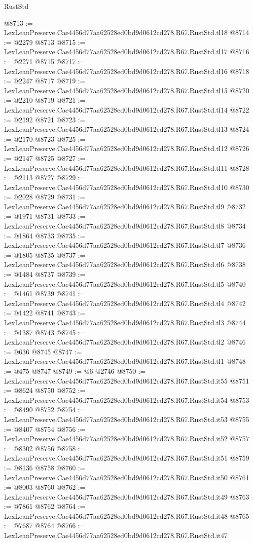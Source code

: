 \begin{lexlean}{RustStd}
\begin{coremodule}
@8713 := LexLeanPreserve.Cae4456d77aa62528ed0bd9d0612cd278.R67.RustStd.tl18
@8714 := @2279 @8713
@8715 := LexLeanPreserve.Cae4456d77aa62528ed0bd9d0612cd278.R67.RustStd.tl17
@8716 := @2271 @8715
@8717 := LexLeanPreserve.Cae4456d77aa62528ed0bd9d0612cd278.R67.RustStd.tl16
@8718 := @2247 @8717
@8719 := LexLeanPreserve.Cae4456d77aa62528ed0bd9d0612cd278.R67.RustStd.tl15
@8720 := @2210 @8719
@8721 := LexLeanPreserve.Cae4456d77aa62528ed0bd9d0612cd278.R67.RustStd.tl14
@8722 := @2192 @8721
@8723 := LexLeanPreserve.Cae4456d77aa62528ed0bd9d0612cd278.R67.RustStd.tl13
@8724 := @2170 @8723
@8725 := LexLeanPreserve.Cae4456d77aa62528ed0bd9d0612cd278.R67.RustStd.tl12
@8726 := @2147 @8725
@8727 := LexLeanPreserve.Cae4456d77aa62528ed0bd9d0612cd278.R67.RustStd.tl11
@8728 := @2113 @8727
@8729 := LexLeanPreserve.Cae4456d77aa62528ed0bd9d0612cd278.R67.RustStd.tl10
@8730 := @2028 @8729
@8731 := LexLeanPreserve.Cae4456d77aa62528ed0bd9d0612cd278.R67.RustStd.tl9
@8732 := @1971 @8731
@8733 := LexLeanPreserve.Cae4456d77aa62528ed0bd9d0612cd278.R67.RustStd.tl8
@8734 := @1864 @8733
@8735 := LexLeanPreserve.Cae4456d77aa62528ed0bd9d0612cd278.R67.RustStd.tl7
@8736 := @1805 @8735
@8737 := LexLeanPreserve.Cae4456d77aa62528ed0bd9d0612cd278.R67.RustStd.tl6
@8738 := @1484 @8737
@8739 := LexLeanPreserve.Cae4456d77aa62528ed0bd9d0612cd278.R67.RustStd.tl5
@8740 := @1461 @8739
@8741 := LexLeanPreserve.Cae4456d77aa62528ed0bd9d0612cd278.R67.RustStd.tl4
@8742 := @1422 @8741
@8743 := LexLeanPreserve.Cae4456d77aa62528ed0bd9d0612cd278.R67.RustStd.tl3
@8744 := @1387 @8743
@8745 := LexLeanPreserve.Cae4456d77aa62528ed0bd9d0612cd278.R67.RustStd.tl2
@8746 := @636 @8745
@8747 := LexLeanPreserve.Cae4456d77aa62528ed0bd9d0612cd278.R67.RustStd.tl1
@8748 := @475 @8747
@8749 := @6 @2746
@8750 := LexLeanPreserve.Cae4456d77aa62528ed0bd9d0612cd278.R67.RustStd.it55
@8751 := @8624 @8750
@8752 := LexLeanPreserve.Cae4456d77aa62528ed0bd9d0612cd278.R67.RustStd.it54
@8753 := @8490 @8752
@8754 := LexLeanPreserve.Cae4456d77aa62528ed0bd9d0612cd278.R67.RustStd.it53
@8755 := @8407 @8754
@8756 := LexLeanPreserve.Cae4456d77aa62528ed0bd9d0612cd278.R67.RustStd.it52
@8757 := @8302 @8756
@8758 := LexLeanPreserve.Cae4456d77aa62528ed0bd9d0612cd278.R67.RustStd.it51
@8759 := @8136 @8758
@8760 := LexLeanPreserve.Cae4456d77aa62528ed0bd9d0612cd278.R67.RustStd.it50
@8761 := @8003 @8760
@8762 := LexLeanPreserve.Cae4456d77aa62528ed0bd9d0612cd278.R67.RustStd.it49
@8763 := @7861 @8762
@8764 := LexLeanPreserve.Cae4456d77aa62528ed0bd9d0612cd278.R67.RustStd.it48
@8765 := @7687 @8764
@8766 := LexLeanPreserve.Cae4456d77aa62528ed0bd9d0612cd278.R67.RustStd.it47

\end{coremodule}
\end{lexlean}
